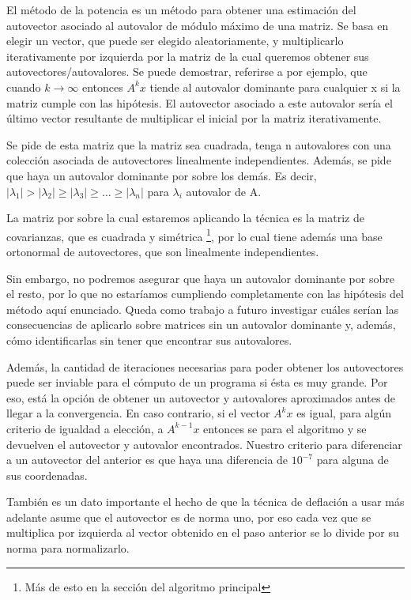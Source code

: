 El método de la potencia es un método para obtener una estimación del autovector asociado al
autovalor de módulo máximo de una matriz. Se basa en elegir un vector, que puede ser elegido
aleatoriamente, y multiplicarlo iterativamente por izquierda por la matriz de la cual queremos
obtener sus autovectores/autovalores. Se puede demostrar, referirse a \cite[p.~576]{burden} por
ejemplo, que cuando $k \rightarrow \infty$ entonces $A^k x$ tiende al autovalor dominante para cualquier x si
la matriz cumple con las hipótesis. El autovector asociado a este autovalor sería el
último vector resultante de multiplicar el inicial por la matriz iterativamente.

Se pide de esta matriz que la matriz sea cuadrada, tenga n autovalores con una colección asociada de
autovectores linealmente independientes. Además, se pide que haya un autovalor dominante por sobre
los demás. Es decir, $ |\lambda_1| > |\lambda_2| \geq |\lambda_3| \geq \ldots \geq |\lambda_n|$ para
$\lambda_i$ autovalor de A.

La matriz por sobre la cual estaremos aplicando la técnica es la matriz de covarianzas, que es
cuadrada y simétrica \footnote{Más de esto en la sección del algoritmo principal}, por lo cual tiene
además una base ortonormal de autovectores, que son linealmente independientes.

Sin embargo, no podremos asegurar que haya un autovalor dominante por sobre el resto, por lo que no
estaríamos cumpliendo completamente con las hipótesis del método aquí enunciado. Queda como trabajo
a futuro investigar cuáles serían las consecuencias de aplicarlo sobre matrices sin un autovalor
dominante y, además, cómo identificarlas sin tener que encontrar sus autovalores.

Además, la cantidad de iteraciones necesarias para poder obtener los autovectores puede ser inviable
para el cómputo de un programa si ésta es muy grande. Por eso, está la opción de obtener un
autovector y autovalores aproximados antes de llegar a la convergencia. En caso contrario, si el
vector $A^k x$ es igual, para algún criterio de igualdad a elección, a $A^{k-1} x$ entonces se para
el algoritmo y se devuelven el autovector y autovalor encontrados. Nuestro criterio para diferenciar
a un autovector del anterior es que haya una diferencia de $10^{-7}$ para alguna de sus coordenadas.

También es un dato importante el hecho de que la técnica de deflación a usar más adelante asume que
el autovector es de norma uno, por eso cada vez que se multiplica por izquierda al vector obtenido
en el paso anterior se lo divide por su norma para normalizarlo.
